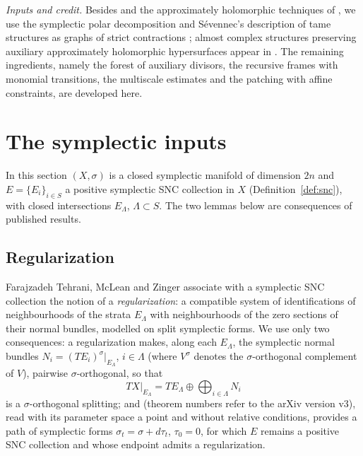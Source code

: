 \documentclass[12pt]{article}
\theoremstyle{remark}
\begin{document}
\emph{Inputs and credit.}
Besides \cite[Theorem 2.13]{FMZ} and the approximately holomorphic
techniques of \cite{Donaldson1996,Auroux1997,Auroux2001,Mohsen2019},
we use the symplectic polar decomposition \cite[Theorem 2.16]{Wendl}
and S\'evennec's description of tame structures as graphs of strict
contractions \cite[Theorem 2.37]{Wendl}; almost complex structures
preserving auxiliary approximately holomorphic hypersurfaces appear in
\cite[Section 8]{CM}. The remaining ingredients, namely the forest of
auxiliary divisors, the recursive frames with monomial transitions, the
multiscale estimates and the patching with affine constraints, are
developed here.

\section{The symplectic inputs}\label{sec:inputs}

In this section $(X,\sigma)$ is a closed symplectic manifold of
dimension $2n$ and $E=\{E_i\}_{i\in S}$ a positive symplectic SNC
collection in $X$ (Definition~\ref{def:snc}), with closed intersections
$E_\Lambda$, $\Lambda\subset S$. The two lemmas below are consequences
of published results.

\subsection{Regularization}

Farajzadeh Tehrani, McLean and Zinger \cite{FMZ} associate with a
symplectic SNC collection the notion of a \emph{regularization}: a
compatible system of identifications of neighbourhoods of the strata
$E_\Lambda$ with neighbourhoods of the zero sections of their normal
bundles, modelled on split symplectic forms. We use only two
consequences: a regularization makes, along each $E_\Lambda$, the
symplectic normal bundles $N_i=(TE_i)^{\sigma}|_{E_\Lambda}$,
$i\in\Lambda$ (where $V^\sigma$ denotes the $\sigma$-orthogonal
complement of $V$), pairwise $\sigma$-orthogonal, so that
\begin{equation}\label{eq:split}
 TX|_{E_\Lambda}=TE_\Lambda\oplus\bigoplus_{i\in\Lambda}N_i
\end{equation}
is a $\sigma$-orthogonal splitting; and \cite[Theorem 2.13]{FMZ}
(theorem numbers refer to the arXiv version v3), read with its
parameter space a point and without relative conditions, provides a
path of symplectic forms $\sigma_t=\sigma+d\tau_t$, $\tau_0=0$, for which
$E$ remains a positive SNC collection and whose endpoint admits a
regularization.
\end{document}
